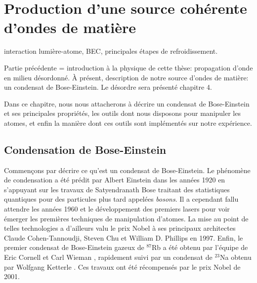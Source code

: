 \chapter{Production d'une source cohérente d'ondes de matière}
\label{ch:BEC_manip}


interaction lumière-atome, BEC, principales étapes de refroidissement. 

Partie précédente = introduction à la physique de cette thèse: propagation d'onde en milieu désordonné. À présent, description de notre source d'ondes de matière: un condensat de Bose-Einstein. Le désordre sera présenté chapitre 4. 

Dans ce chapitre, nous nous attacherons à décrire un condensat de Bose-Einstein et ses principales propriétés, les outils dont nous disposons pour manipuler les atomes, et enfin la manière dont ces outils sont implémentés sur notre expérience.

\section{Condensation de Bose-Einstein}
Commençons par décrire ce qu'est un condensat de Bose-Einstein. Le phénomène de condensation a été prédit par Albert Einstein dans les années 1920 en s'appuyant sur les travaux de Satyendranath Bose traitant des statistiques quantiques pour des particules plus tard appelées \emph{bosons}. Il a cependant fallu attendre les années 1960 et le développement des premiers lasers pour voir émerger les premières techniques de manipulation d'atomes. La mise au point de telles technologies a d'ailleurs valu le prix Nobel à ses principaux architectes Claude Cohen-Tannoudji, Steven Chu et William D. Phillips en 1997. Enfin, le premier condensat de Bose-Einstein gazeux de ${}^{87}$Rb a été obtenu par l'équipe de Eric Cornell et Carl Wieman \citep{anderson1995observation}, rapidement suivi par un condensat de ${}^{23}$Na obtenu par Wolfgang Ketterle \citep{davis1995bose}. Ces travaux ont été récompensés par le prix Nobel de 2001.

